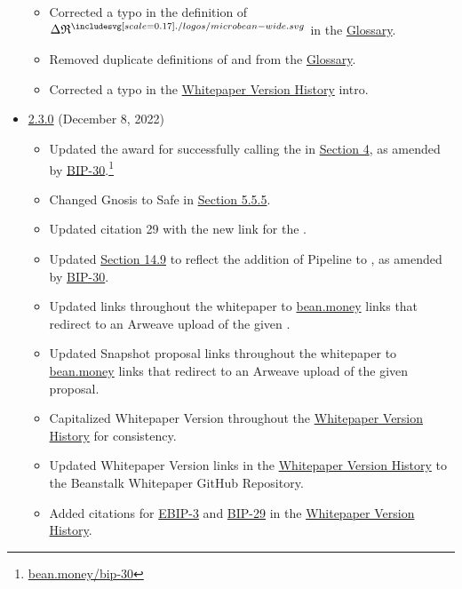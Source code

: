 \documentclass[class=article, crop=false]{standalone}
\begin{document}
\begin{itemize}[topsep=0pt, itemsep=3pt,leftmargin=16pt]
\begin{itemize}
        \item Corrected a typo in the definition of $\Delta \mathfrak{R}^{\bean}$ in the \hyperlink{subsection.14.11}{Glossary}.
        \item Removed duplicate definitions of  and  from the \hyperlink{subsection.14.11}{Glossary}.
        \item Corrected a typo in the \hyperlink{subsection.14.12}{Whitepaper Version History} intro.
    \end{itemize}  
            \item \href{https://github.com/BeanstalkFarms/Beanstalk-Whitepaper/blob/master/version-history/beanstalk2_3_0.pdf}{2.3.0} (December 8, 2022)
    \begin{itemize}
        \item Updated the award for successfully calling the  in \hyperlink{section.4}{Section 4}, as amended by \href{https://bean.money/bip-30}{BIP-30}.\footnote{\href{https://bean.money/bip-30}{bean.money/bip-30}}
        \item Changed Gnosis to Safe in \hyperlink{subsubsection.5.5.5}{Section 5.5.5}.
        \item Updated citation 29 with the new link for the .
        \item Updated \hyperlink{subsection.14.9}{Section 14.9} to reflect the addition of Pipeline  to , as amended by \href{https://bean.money/bip-30}{BIP-30}.
        \item Updated  links throughout the whitepaper to \href{https://bean.money}{bean.money} links that redirect to an Arweave upload of the given .
        \item Updated Snapshot proposal links throughout the whitepaper to \href{https://bean.money}{bean.money} links that redirect to an Arweave upload of the given proposal.
        \item Capitalized Whitepaper Version throughout the \hyperlink{subsection.14.12}{Whitepaper Version History} for consistency.
        \item Updated Whitepaper Version links in the \hyperlink{subsection.14.12}{Whitepaper Version History} to the Beanstalk Whitepaper GitHub Repository.
        \item Added citations for \href{https://bean.money/ebip-3}{EBIP-3} and \href{https://bean.money/bip-29}{BIP-29} in the \hyperlink{subsection.14.12}{Whitepaper Version History}.

\end{itemize}
\end{itemize}
\end{document}
